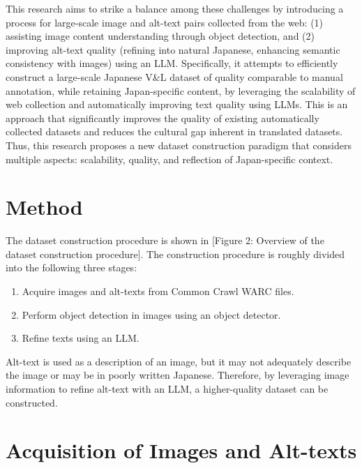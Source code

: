 \documentclass[11pt]{article}
\begin{document}
This research aims to strike a balance among these challenges by introducing a process for large-scale image and alt-text pairs collected from the web: (1) assisting image content understanding through object detection, and (2) improving alt-text quality (refining into natural Japanese, enhancing semantic consistency with images) using an LLM. Specifically, it attempts to efficiently construct a large-scale Japanese V\&L dataset of quality comparable to manual annotation, while retaining Japan-specific content, by leveraging the scalability of web collection and automatically improving text quality using LLMs. This is an approach that significantly improves the quality of existing automatically collected datasets and reduces the cultural gap inherent in translated datasets. Thus, this research proposes a new dataset construction paradigm that considers multiple aspects: scalability, quality, and reflection of Japan-specific context.

\section{Method}

The dataset construction procedure is shown in [Figure 2: Overview of the dataset construction procedure]. The construction procedure is roughly divided into the following three stages:

\begin{enumerate}
  \item Acquire images and alt-texts from Common Crawl WARC files.
  \item Perform object detection in images using an object detector.
  \item Refine texts using an LLM.
\end{enumerate}

Alt-text is used as a description of an image, but it may not adequately describe the image or may be in poorly written Japanese. Therefore, by leveraging image information to refine alt-text with an LLM, a higher-quality dataset can be constructed.

\section{Acquisition of Images and Alt-texts}
\end{document}
